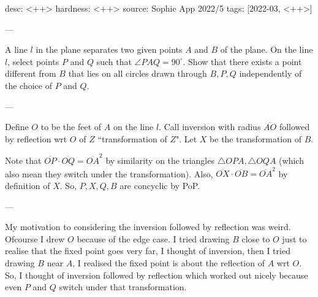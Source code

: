 desc: <++>
hardness: <++>
source: Sophie App 2022/5
tags: [2022-03, <++>]

---

A line $l$ in the plane separates two given points $A$ and $B$ of the plane. On the line $l$,
select points $P$ and $Q$ such that $\angle PAQ = 90^\circ$. 
Show that there exists a point different from $B$ that lies on all circles drawn through $B,P,Q$ independently of the choice of $P$ and $Q$.

---

Define $O$ to be the feet of $A$ on the line $l$.
Call inversion with radius $\overline{AO}$ followed by reflection wrt $O$ of $Z$  ``transformation of $Z$".
Let $X$ be the transformation of $B$.

Note that $\overline{OP} \cdot \overline{OQ} = \overline{OA}^2$ by similarity on the triangles $\triangle OPA, \triangle OQA$ (which also mean they switch under the transformation). 
Also, $\overline{OX} \cdot \overline{OB} = \overline{OA}^2$ by definition of $X$.
So, $P,X,Q,B$ are concyclic by PoP.

---

My motivation to considering the inversion followed by reflection was weird.
Ofcourse I drew $O$ because of the edge case.
I tried drawing $B$ close to $O$ just to realise that the fixed point goes 
very far, I thought of inversion, then I tried drawing $B$ near $A$, I realised 
the fixed point is about the reflection of $A$ wrt $O$. 
So, I thought of inversion followed by reflection which worked out nicely because 
even $P$ and $Q$ switch under that transformation.
